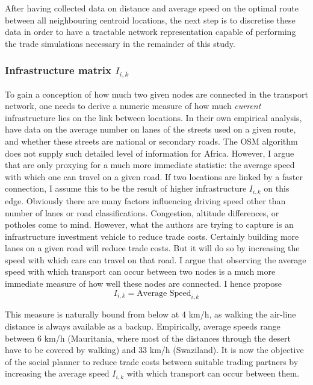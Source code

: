 \documentclass[11pt, oneside]{article}   	%
\begin{document}
After having collected data on distance and average speed on the optimal route between all neighbouring centroid locations, the next step is to discretise these data in order to have a tractable network representation capable of performing the trade simulations necessary in the remainder of this study.

\subsubsection{Infrastructure matrix $I_{i,k}$}
To gain a conception of how much two given nodes are connected in the transport network, one needs to derive a numeric measure of how much \emph{current} infrastructure lies on the link between locations. In their own empirical analysis, \cite{fajgelbaum_optimal_2017} have data on the average number on lanes of the streets used on a given route, and whether these streets are national or secondary roads. The OSM algorithm does not supply such detailed level of information for Africa. However, I argue that \citeauthor{fajgelbaum_optimal_2017} are only proxying for a much more immediate statistic: the average speed with which one can travel on a given road. If two locations are linked by a faster connection, I assume this to be the result of higher infrastructure $I_{i,k}$ on this edge. Obviously there are many factors influencing driving speed other than number of lanes or road classifications. Congestion, altitude differences, or potholes come to mind. However, what the authors are trying to capture is an infrastructure investment vehicle to reduce trade costs. Certainly building more lanes on a given road will reduce trade costs. But it will do so by increasing the speed with which cars can travel on that road. I argue that observing the average speed with which transport can occur between two nodes is a much more immediate measure of how well these nodes are connected. I hence propose
\begin{equation}
  I_{i,k} = \textrm{Average Speed}_{i,k}
\end{equation}

This measure is naturally bound from below at 4 km/h, as walking the air-line distance is always available as a backup. Empirically, average speeds range between 6 km/h (Mauritania, where most of the distances through the desert have to be covered by walking) and 33 km/h (Swaziland). It is now the objective of the social planner to reduce trade costs between suitable trading partners by increasing the average speed $I_{i,k}$ with which transport can occur between them.
\end{document}
